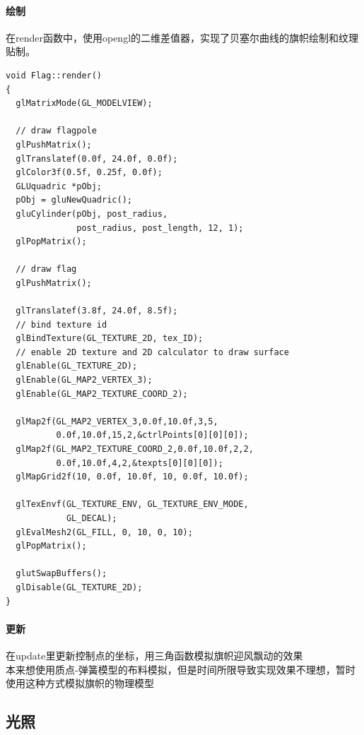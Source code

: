 \documentclass{article}
\begin{document}
            \paragraph{绘制}
            在render函数中，使用opengl的二维差值器，实现了贝塞尔曲线的旗帜绘制和纹理贴制。
            \begin{lstlisting}[language={[ANSI]C}]
void Flag::render()
{
  glMatrixMode(GL_MODELVIEW);

  // draw flagpole
  glPushMatrix();
  glTranslatef(0.0f, 24.0f, 0.0f);
  glColor3f(0.5f, 0.25f, 0.0f);
  GLUquadric *pObj;
  pObj = gluNewQuadric();
  gluCylinder(pObj, post_radius,
              post_radius, post_length, 12, 1);
  glPopMatrix();

  // draw flag
  glPushMatrix();

  glTranslatef(3.8f, 24.0f, 8.5f);
  // bind texture id
  glBindTexture(GL_TEXTURE_2D, tex_ID);
  // enable 2D texture and 2D calculator to draw surface
  glEnable(GL_TEXTURE_2D);
  glEnable(GL_MAP2_VERTEX_3);
  glEnable(GL_MAP2_TEXTURE_COORD_2);
  
  glMap2f(GL_MAP2_VERTEX_3,0.0f,10.0f,3,5,
          0.0f,10.0f,15,2,&ctrlPoints[0][0][0]);
  glMap2f(GL_MAP2_TEXTURE_COORD_2,0.0f,10.0f,2,2,
          0.0f,10.0f,4,2,&texpts[0][0][0]);
  glMapGrid2f(10, 0.0f, 10.0f, 10, 0.0f, 10.0f);

  glTexEnvf(GL_TEXTURE_ENV, GL_TEXTURE_ENV_MODE,
            GL_DECAL);
  glEvalMesh2(GL_FILL, 0, 10, 0, 10);
  glPopMatrix();

  glutSwapBuffers();
  glDisable(GL_TEXTURE_2D);
}
            \end{lstlisting}
            \paragraph{更新}
            在update里更新控制点的坐标，用三角函数模拟旗帜迎风飘动的效果\\
            本来想使用质点-弹簧模型的布料模拟，但是时间所限导致实现效果不理想，暂时使用这种方式模拟旗帜的物理模型
        \subsection{光照}
\end{document}
